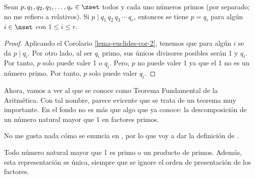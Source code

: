 \begin{corollary}\label{lema-euclides-cor-3}
  Sean $p, q_1, q_2, q_3, \ldots, q_r \in \zset$ todos y cada uno números
  primos (por separado; no me refiero a relativos). Si $p \mid q_1 \, q_2 \,
  q_3 \, \cdots \, q_r$, entonces se tiene $p = q_i$ para algún $i \in
  \nset$ con $1 \leq i \leq r$.
\end{corollary}

\begin{proof}
  Aplicando el Corolario \ref{lema-euclides-cor-2}, tenemos que para algún
  $i$ se da $p \mid q_i$. Por otro lado, al ser $q_i$ primo, sus únicos
  divisores posibles serán 1 y $q_i$. Por tanto, $p$ solo puede valer 1 o
  $q_i$. Pero, $p$ no puede valer 1 ya que el 1 no es un número primo. Por
  tanto, $p$ solo puede valer $q_i$.
\end{proof}

Ahora, vamos a ver al que se conoce como Teorema Fundamental de la
Aritmética. Con tal nombre, parece evicente que se trata de un teorema muy
importante. En el fondo no es más que algo que ya conoce: la descomposición
de un número natural mayor que 1 en factores primos.

No me gusta nada cómo se enuncia en \cite{texto-uned}, por lo que
voy a dar la definición de \cite{burton}.

\begin{theorem}\label{th-fundamental-aritmetica}
  Todo número natural mayor que 1 es primo o un producto de primos. Además,
  esta representación es única, siempre que se ignore el orden de
  presentación de los factores.
\end{theorem}

\iffalse
\begin{theorem}[Fundamental de la
  Aritmética]\label{th-fundamental-aritmetica}
  Dado $n \in \zset$ con $n > 1$. Existe un conjunto de números primos $p_1,
  p_2, p_3, \ldots, p_r$ tales que

  $$ n = p_1 \cdot p_2 \cdot p_3 \cdot \cdots \cdot p_r $$

  \noindent donde $p_1 \leq p_2 \leq p_3 \leq \cdots \leq p_r$.

  Además, la factorización es única en el sentido siguiente. Sean $q_1, q_2,
  q_3, \ldots, q_s$ números primos con $q_1 \leq q_2 \leq q_3 \leq \cdots
  \leq q_s$ y tales que $n = q_1 \cdot q_2 \cdot q_3 \cdot \cdots \cdot
  q_s$, entonces $r = s$ y para todo $i \in \zset$ con $1 \leq i \leq r$ se
  tiene $p_i = q_i$.
\end{theorem}
\fi

